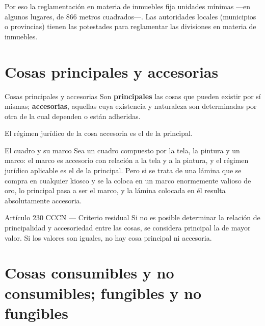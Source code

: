 \documentclass[12pt,oneside]{book}
\begin{document}
Por eso la reglamentación en materia de inmuebles fija unidades mínimas ---en algunos lugares, de 866 metros cuadrados---. Las autoridades locales (municipios o provincias) tienen las potestades para reglamentar las divisiones en materia de inmuebles.

\section{Cosas principales y accesorias}

\begin{definition}{Cosas principales y accesorias}
Son \textbf{principales} las cosas que pueden existir por sí mismas; \textbf{accesorias}, aquellas cuya existencia y naturaleza son determinadas por otra de la cual dependen o están adheridas.
\end{definition}

El régimen jurídico de la cosa accesoria es el de la principal.

\begin{example}{El cuadro y su marco}
Sea un cuadro compuesto por la tela, la pintura y un marco: el marco es accesorio con relación a la tela y a la pintura, y el régimen jurídico aplicable es el de la principal. Pero si se trata de una lámina que se compra en cualquier kiosco y se la coloca en un marco enormemente valioso de oro, lo principal pasa a ser el marco, y la lámina colocada en él resulta absolutamente accesoria.
\end{example}

\begin{norma}{Artículo 230 CCCN --- Criterio residual}
Si no es posible determinar la relación de principalidad y accesoriedad entre las cosas, se considera principal la de mayor valor. Si los valores son iguales, no hay cosa principal ni accesoria.
\end{norma}

\section{Cosas consumibles y no consumibles; fungibles y no fungibles}
\end{document}
